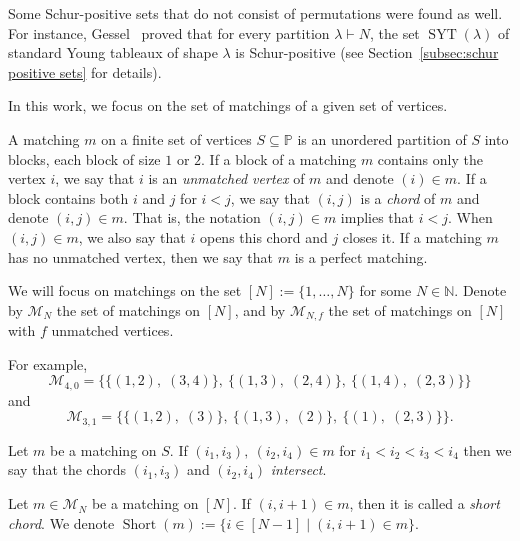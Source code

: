 \documentclass[ALCO]{cedram}
\newcommand{\Syt}{\operatorname{SYT}}
\newcommand{\Short}{\operatorname{Short}}
\newcommand{\NN}{\mathbb{N}}
\newcommand{\PP}{\mathbb{P}}
\newcommand{\M}{\mathcal{M}}
\begin{document}
Some Schur-positive sets that do not consist of permutations were found as well. For instance, Gessel~\cite{knuth_classes_schur_positive} proved that for every partition $\lambda \vdash N$, the set $\Syt(\lambda)$ of standard Young tableaux of shape $\lambda$ is Schur-positive (see Section~\ref{subsec:schur positive sets} for details).

In this work, we focus on the set of matchings of a given set of vertices.
\begin{definition}
\label{def:matching}
    A matching $m$ on a finite set of vertices $S \subseteq \PP$ is an unordered partition of $S$ into blocks, each block of size $1$ or $2$. If a block of a matching $m$ contains only the vertex $i$, we say that $i$ is an \emph{unmatched vertex} of $m$ and denote $(i) \in m$. If a block contains both $i$ and $j$ for $i<j$, we say that $(i,j)$ is a \emph{chord} of $m$ and denote $(i,j) \in m$. That is, the notation $(i,j)\in m$ implies that $i<j$. When $(i,j) \in m$, we also say that $i$ opens this chord and $j$ closes it. If a matching $m$ has no unmatched vertex, then we say that $m$ is a perfect matching.
\end{definition}

We will focus on matchings on the set $[N] := \{1,\dots, N\}$ for some $N \in \NN$. Denote by $\M_N$ the set of matchings on $[N]$, and by $\M_{N,f}$ the set of matchings on $[N]$ with $f$ unmatched vertices.

For example, 
\[
    \M_{4,0} = \big\{\{(1,2),\; (3,4)\},\ \{(1,3),\; (2,4)\},\ \{(1,4),\; (2,3)\}\big\}
\]
and
\[ 
    \M_{3,1} = \big\{\{(1,2),\; (3)\},\ \{(1,3),\; (2)\},\ \{(1),\; (2,3)\}\big\}.
\]

\begin{definition}
\label{def:intersect}
    Let $m$ be a matching on $S$. If $(i_1, i_3),\: (i_2,i_4) \in m$ for $i_1 < i_2 < i_3 < i_4$ then we say that the chords $(i_1, i_3)$ and $(i_2, i_4)$ \emph{intersect}.
\end{definition}

\begin{definition}
\label{def:short}
    Let $m \in \M_N$ be a matching on $[N]$. If $(i,i+1) \in m$, then it is called a \emph{short chord}. We denote $\Short(m) := \{i \in [N-1] \mid (i,i+1) \in m\}$.

\end{definition}
\end{document}
